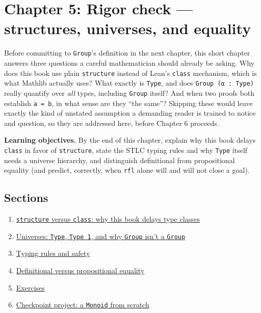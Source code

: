 \chapter{Chapter 5: Rigor check --- structures, universes, and equality}\label{sec:05-rigor-check:00-index:1}

Before committing to \texttt{Group}'s definition in the next chapter, this short chapter answers three questions a careful mathematician should already be asking. Why does this book use plain \texttt{structure} instead of Lean's \texttt{class} mechanism, which is what Mathlib actually uses? What exactly is \texttt{Type}, and does \texttt{Group (α : Type)} really quantify over \emph{all} types, including \texttt{Group} itself? And when two proofs both establish \texttt{a = b}, in what sense are they ``the same''? Skipping these would leave exactly the kind of unstated assumption a demanding reader is trained to notice and question, so they are addressed here, before Chapter 6 proceeds.

\textbf{Learning objectives.} By the end of this chapter, explain why this book delays \texttt{class} in favor of \texttt{structure}, state the STLC typing rules and why \texttt{Type} itself needs a universe hierarchy, and distinguish definitional from propositional equality (and predict, correctly, when \texttt{rfl} alone will and will not close a goal).

\section{Sections}\label{sec:05-rigor-check:00-index:2}

\begin{enumerate}
\def\labelenumi{\arabic{enumi}.}
\tightlist
\item
  \hyperref[sec:05-rigor-check:01-structure-vs-class:1]{\texttt{structure} versus \texttt{class}: why this book delays type classes}
\item
  \hyperref[sec:05-rigor-check:02-universes:1]{Universes: \texttt{Type}, \texttt{Type 1}, and why \texttt{Group} isn't a \texttt{Group}}
\item
  \hyperref[sec:05-rigor-check:03-typing-rules-and-safety:1]{Typing rules and safety}
\item
  \hyperref[sec:05-rigor-check:04-defeq-vs-propeq:1]{Definitional versus propositional equality}
\item
  \hyperref[sec:05-rigor-check:05-exercises:1]{Exercises}
\item
  \hyperref[sec:05-rigor-check:06-checkpoint-project:1]{Checkpoint project: a \texttt{Monoid} from scratch}
\end{enumerate}







